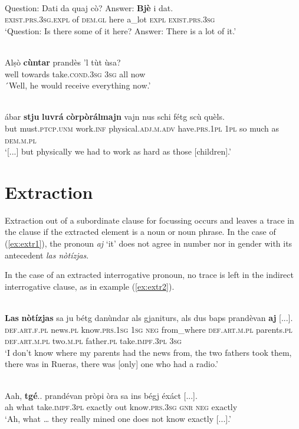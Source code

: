 \ea
\label{}
\\
\gll Question: Dati da quaj cò? Answer: \textbf{Bjè} i dat.\\
{} \textsc{exist.prs.3sg.expl} of \textsc{dem.gl} here {} a\_lot \textsc{expl} \textsc{exist.prs.3sg} \\
\glt `Question: Is there some of it here? Answer: There is a lot of it.'
\z

\ea\label{}
\\
\gll Alṣò \textbf{cùntar} prandès 'l tùt ùsa?\\
well towards take.\textsc{cond.3sg} \textsc{3sg} all	now\\
\glt ´Well, he would receive everything now.'
\z

\ea
\label{}
\\
	\gll [...] ábar \textbf{stju} \textbf{luvrá} \textbf{còrpòrálmajn} vajn nus schi fétg scù quèls.\\
{}	but must.\textsc{ptcp.unm} work.\textsc{inf} physical.\textsc{adj.m.adv} have.\textsc{prs.1pl} \textsc{1pl} so much as \textsc{dem.m.pl}\\
\glt `[...] but physically we had to work as hard as those [children].'
\z

\section{Extraction}
Extraction out of a subordinate clause for focussing occurs and leaves a trace in the clause if the extracted element is a noun or noun phrase. In the case of (\ref{ex:extr1}), the pronoun \textit{aj} `it' does not agree in number nor in gender with its antecedent \textit{las nòtízjas}.

In the case of an extracted interrogative pronoun, no trace is left in the indirect interrogative clause, as in example (\ref{ex:extr2}).  

\ea\label{ex:extr1}
\\
\gll  \textbf{Las} \textbf{nòtízjas} sa ju bétg danùndar als gjaniturs, als dus baps prandèvan \textbf{aj} [...]. \\
\textsc{def.art.f.pl} news.\textsc{pl} know.\textsc{prs.1sg} \textsc{1sg} \textsc{neg} from\_where \textsc{def.art.m.pl} parents.\textsc{pl} \textsc{def.art.m.pl} two.\textsc{m.pl} father.\textsc{pl} take.\textsc{impf.3pl} \textsc{3sg}\\
\glt `I don’t know where my parents had the news from, the two fathers took them, there was in Rueras, there was [only] one who had a radio.'
\z

\ea
\label{ex:extr2}
\\
\gll   Aah, \textbf{tgé}.. prandévan pròpi òra sa ins bégj éxáct [...]. \\
ah what take.\textsc{impf.3pl} exactly out know.\textsc{prs.3sg} \textsc{gnr} \textsc{neg} exactly\\
\glt `Ah, what … they really mined one does not know exactly [...].'
\z




